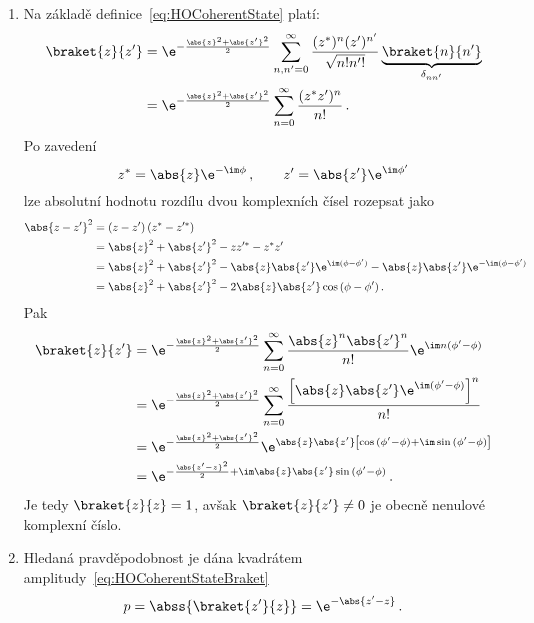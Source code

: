 \begin{solution}
	\begin{enumerate}
	\item
		Na základě definice~\eqref{eq:HOCoherentState} platí:
		\begin{align}
			\braket{z}{z'}
				&=\e^{-\frac{\abs{z}^{2}+\abs{z'}^{2}}{2}}
					\sum_{n,n'=0}^{\infty}\frac{(z^{*})^{n}(z')^{n'}}{\sqrt{n!n'!}}
					\underbrace{\braket{n}{n'}}_{\delta_{nn'}}\nonumber\\
				&=\e^{-\frac{\abs{z}^{2}+\abs{z'}^{2}}{2}}
					\sum_{n=0}^{\infty}\frac{(z^{*}z')^{n}}{n!}\,.
		\end{align}
		Po zavedení
		\begin{equation}
			z^{*}=\abs{z}\e^{-\im\phi}\,,\qquad z'=\abs{z'}\e^{\im\phi'}			
		\end{equation}
		lze absolutní hodnotu rozdílu dvou komplexních čísel rozepsat jako
		\begin{align}
			\abs{z-z'}^{2}
				&=\left(z-z'\right)\left(z^{*}-z'^{*}\right)\nonumber\\
				&=\abs{z}^{2}+\abs{z'}^{2}-zz'^{*}-z^{*}z'\nonumber\\
				&=\abs{z}^{2}+\abs{z'}^{2}-\abs{z}\abs{z'}\e^{\im(\phi-\phi')}
					-\abs{z}\abs{z'}\e^{-\im(\phi-\phi')}\nonumber\\
				&=\abs{z}^{2}+\abs{z'}^{2}-2\abs{z}\abs{z'}\cos{(\phi-\phi')}\,.
		\end{align}		
		Pak
		\begin{align}
			\braket{z}{z'}
				&=\e^{-\frac{\abs{z}^{2}+\abs{z'}^{2}}{2}}\sum_{n=0}^{\infty}
					\frac{\abs{z}^{n}\abs{z'}^{n}}{n!}\e^{\im n(\phi'-\phi)}\nonumber\\
				&=\e^{-\frac{\abs{z}^{2}+\abs{z'}^{2}}{2}}\sum_{n=0}^{\infty}
					\frac{\left[\abs{z}\abs{z'}\e^{\im(\phi'-\phi)}\right]^{n}}{n!}\nonumber\\
				&=\e^{-\frac{\abs{z}^{2}+\abs{z'}^{2}}{2}}\e^{\abs{z}\abs{z'}
					\left[\cos{(\phi'-\phi)}+\im\sin{(\phi'-\phi)}\right]}\nonumber\\
				&=\e^{-\frac{\abs{z'-z}^{2}}{2}+\im\abs{z}\abs{z'}\sin{(\phi'-\phi)}}\,.
		\end{align}
		Je tedy $\braket{z}{z}=1$, avšak $\braket{z}{z'}\neq 0$ je obecně nenulové komplexní číslo.
		
	\item
		Hledaná pravděpodobnost je dána kvadrátem amplitudy~\eqref{eq:HOCoherentStateBraket}
		\begin{equation}
			p=\abss{\braket{z'}{z}}=\e^{-\abs{z'-z}}\,.
		\end{equation}
	

\end{enumerate}
\end{solution}
